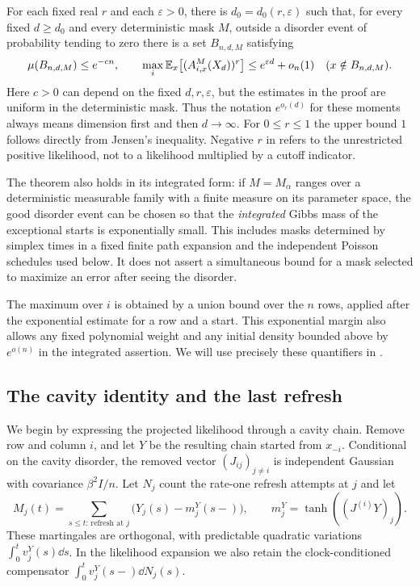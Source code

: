 \begin{theorem}
\label{thm:row-projected-moments}
For each fixed real $r$ and each $\varepsilon>0$, there is
$d_0=d_0(r,\varepsilon)$ such that, for every fixed $d\ge d_0$ and every
deterministic mask $M$, outside a disorder event of probability tending
to zero there is a set $B_{n,d,M}$ satisfying
\begin{equation}
\mu(B_{n,d,M})\le e^{-c n},\qquad
 \max_i\mathbb E_x\bigl[(A_{i,x}^M(X_d))^r\bigr]
       \le e^{\varepsilon d}+o_n(1)
 \quad(x\notin B_{n,d,M}).
 \label{eq:row-moment-quantified}
\end{equation}
Here $c>0$ can depend on the fixed $d,r,\varepsilon$, but the estimates
in the proof are uniform in the deterministic mask.  Thus the notation
$e^{o_r(d)}$ for these moments always means dimension first and then
$d\to\infty$.  For $0\le r\le1$ the upper bound $1$ follows directly
from Jensen's inequality.  Negative $r$ in
 refers to the unrestricted positive
likelihood, not to a likelihood multiplied by a cutoff indicator.

The theorem also holds in its integrated form: if $M=M_\alpha$ ranges
over a deterministic measurable family with a finite measure on its
parameter space, the good disorder event can be chosen so that the
\emph{integrated} Gibbs mass of the exceptional starts is exponentially
small.  This includes masks determined by simplex times in a fixed
finite path expansion and the independent Poisson schedules used below.
It does not assert a simultaneous bound for a mask selected to maximize
an error after seeing the disorder.
\end{theorem}

The maximum over $i$ is obtained by a union bound over the $n$ rows,
applied after the exponential estimate for a row and a start.  This
exponential margin also allows any fixed polynomial weight and any
initial density bounded above by $e^{o(n)}$ in the integrated assertion.
We will use precisely these quantifiers in .

\subsection{The cavity identity and the last refresh}

We begin by expressing the projected likelihood through a cavity chain.
Remove row and column $i$, and let $Y$ be the resulting chain started
from $x_{-i}$.  Conditional on the cavity disorder, the removed vector
$(J_{ij})_{j\ne i}$ is independent Gaussian with covariance
$\beta^2 I/n$.  Let $N_j$ count the rate-one refresh attempts at $j$ and
let
\[
 M_j(t)=\sum_{s\le t:\,\text{refresh at }j}
       \bigl(Y_j(s)-m_j^Y(s-)\bigr),\qquad
 m_j^Y=\tanh((J^{(i)}Y)_j).
\]
These martingales are orthogonal, with predictable quadratic variations
$\int_0^t v_j^Y(s)\dd s$.  In the likelihood expansion we also retain
the clock-conditioned compensator $\int_0^t v_j^Y(s-)\dd N_j(s)$.

